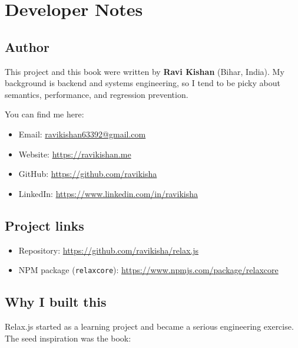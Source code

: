 \chapter*{Developer Notes}

\section*{Author}

This project and this book were written by \textbf{Ravi Kishan} (Bihar, India).
My background is backend and systems engineering, so I tend to be picky about semantics, performance, and regression prevention.

You can find me here:
\begin{itemize}
  \item Email: \href{mailto:ravikishan63392@gmail.com}{ravikishan63392@gmail.com}
  \item Website: \href{https://ravikishan.me}{https://ravikishan.me}
  \item GitHub: \href{https://github.com/ravikisha}{https://github.com/ravikisha}
  \item LinkedIn: \href{https://www.linkedin.com/in/ravikisha}{https://www.linkedin.com/in/ravikisha}
\end{itemize}

\section*{Project links}

\begin{itemize}
  \item Repository: \href{https://github.com/ravikisha/relax.js}{https://github.com/ravikisha/relax.js}
  \item NPM package (\texttt{relaxcore}): \href{https://www.npmjs.com/package/relaxcore}{https://www.npmjs.com/package/relaxcore}
\end{itemize}

\section*{Why I built this}

Relax.js started as a learning project and became a serious engineering exercise.
The seed inspiration was the book:

